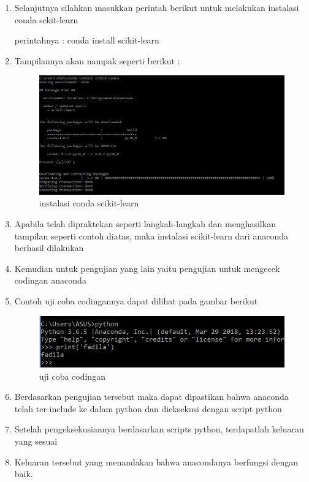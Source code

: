 \begin{itemize}
\begin{enumerate}
\par
\item Selanjutnya silahkan masukkan perintah berikut untuk melakukan instalasi conda sckit-learn
\par perintahnya : conda install scikit-learn
\item Tampilannya akan nampak seperti berikut :
\par

\begin{figure}[ht]
\centering
\includegraphics[scale=0.3]{figures/scikit4.JPG}
\caption{instalasi conda scikit-learn}
\label{contoh}
\end{figure}

\par
\par
\par
\item Apabila telah dipraktekan seperti langkah-langkah dan menghasilkan tampilan seperti contoh diatas, maka instalasi scikit-learn dari anaconda berhasil dilakukan
\par
\item Kemudian untuk pengujian yang lain yaitu pengujian untuk mengecek codingan anaconda
\par
\item Contoh uji coba codingannya dapat dilihat pada gambar berikut
\par
\begin{figure}[ht]
\centering
\includegraphics[scale=0.5]{figures/3.JPG}
\caption{uji coba codingan}
\label{contoh}
\end{figure}
\par
\item Berdasarkan pengujian tersebut maka dapat dipastikan bahwa anaconda telah ter-include ke dalam python dan dieksekusi dengan script python
\item Setelah pengeksekusiannya berdasarkan scripts python, terdapatlah keluaran yang sesuai
\item Keluaran tersebut yang menandakan bahwa anacondanya berfungsi dengan baik.
\end{enumerate}
\end{itemize}


